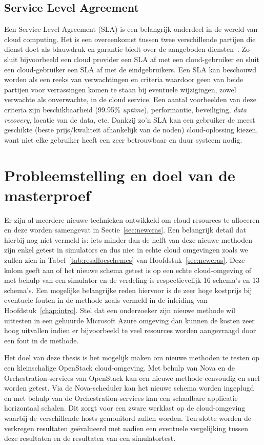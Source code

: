 \subsection{Service Level Agreement}

Een Service Level Agreement (SLA) is een belangrijk onderdeel in de wereld van cloud computing. Het is een overeenkomst tussen twee verschillende partijen die dienst doet als blauwdruk en garantie biedt over de aangeboden diensten~\cite{Wired2017}. Zo sluit bijvoorbeeld een cloud provider een SLA af met een cloud-gebruiker en sluit een cloud-gebruiker een SLA af met de eindgebruikers. Een SLA kan beschouwd worden als een reeks van verwachtingen en criteria waardoor geen van beide partijen voor verrassingen komen te staan bij eventuele wijzigingen, zowel verwachte als onverwachte, in de cloud service. Een aantal voorbeelden van deze criteria zijn beschikbaarheid (99.95\% \textit{uptime}), performantie, beveiliging, \textit{data recovery}, locatie van de data, etc. Dankzij zo'n SLA kan een gebruiker de meest geschikte (beste prijs/kwaliteit afhankelijk van de noden) cloud-oplossing kiezen, want niet elke gebruiker heeft een zeer betrouwbaar en duur systeem nodig.

\section{Probleemstelling en doel van de masterproef}
\label{sec:problem}

Er zijn al meerdere nieuwe technieken ontwikkeld om cloud resources te alloceren en deze worden samengevat in Sectie~\ref{sec:newcras}. Een belangrijk detail dat hierbij nog niet vermeld is: iets minder dan de helft van deze nieuwe methoden zijn enkel getest in simulators en dus niet in echte cloud omgevingen zoals we zullen zien in Tabel~\ref{tab:resallocschemes} van Hoofdstuk~\ref{sec:newcras}. Deze kolom geeft aan of het nieuwe schema getest is op een echte cloud-omgeving of met behulp van een simulator en de verdeling is respectievelijk 16 schema's en 13 schema's. Een mogelijke belangrijke reden hiervoor is de zeer hoge kostprijs bij eventuele fouten in de methode zoals vermeld in de inleiding van Hoofdstuk~\ref{chap:intro}. Stel dat een onderzoeker zijn nieuwe methode wil uittesten in een gehuurde Microsoft Azure omgeving dan kunnen de kosten zeer hoog uitvallen indien er bijvoorbeeld te veel resources worden aangevraagd door een fout in de methode.

Het doel van deze thesis is het mogelijk maken om nieuwe methoden te testen op een kleinschalige OpenStack cloud-omgeving. Met behulp van Nova en de Orchestration-services van OpenStack kan een nieuwe methode eenvoudig en snel worden getest. Via de Nova-scheduler kan het nieuwe schema worden ingeplugd en met behulp van de Orchestration-services kan een schaalbare applicatie horizontaal schalen. Dit zorgt voor een zware werklast op de cloud-omgeving waarbij de verschillende hosts gemonitord zullen worden. Ten slotte worden de verkregen resultaten geëvalueerd met nadien een eventuele vergelijking tussen deze resultaten en de resultaten van een simulatortest.

